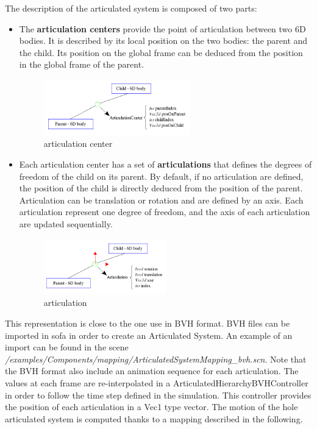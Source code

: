 The description of the articulated system is composed of two parts:
\begin{itemize}
\item The \textbf{articulation centers} provide the point of articulation between two 6D bodies. It is described by its local position on the two bodies: the parent and the child. Its position on the global frame can be deduced from the position in the global frame of the parent.

\begin{figure}[hp]
	\centering
		\includegraphics[width=0.6\textwidth]{articulationcenter.png}
	\caption{articulation center}
	\label{articulation center}
\end{figure}

\item Each articulation center has a set of \textbf{articulations} that defines the degrees of freedom of the child on its parent. By default, if no articulation are defined, the position of the child is directly deduced from the position of the parent. Articulation can be translation or rotation and are defined by an axis. Each articulation represent one degree of freedom, and the axis of each articulation are updated sequentially.

\begin{figure}[hp]
	\centering
		\includegraphics[width=0.5\textwidth]{articulation.png}
	\caption{articulation}
	\label{articulation}
\end{figure}

\end{itemize}


This representation is close to the one use in BVH format. BVH files can be imported in sofa in order to create an Articulated System. An example of an import can be found in the scene \textit{/examples/Components/mapping/ArticulatedSystemMapping\_bvh.scn}.
\newline
\newline
Note that the BVH format also include an animation sequence for each articulation. The values at each frame are re-interpolated in a ArticulatedHierarchyBVHController in order to follow the time step defined in the simulation. This controller provides the position of each articulation in a Vec1 type vector. The motion of the hole articulated system is computed thanks to a mapping described in the following.

